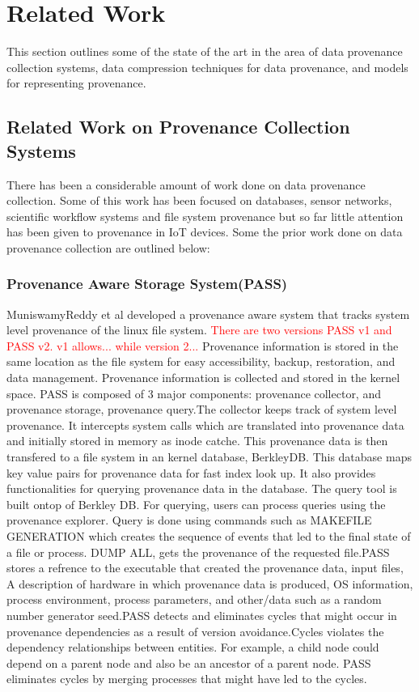 


\chapter{Related Work}\label{background}

This section outlines some of the state of the art in the area of data provenance collection systems, data compression techniques for data provenance, and models for representing provenance.


\section{Related Work on Provenance Collection Systems}

There has been a considerable amount of work done on data provenance collection. Some of this work has been focused on databases, sensor networks, scientific workflow systems and file system provenance but so far little attention has been given to provenance in IoT devices. Some the prior work done on data provenance collection are outlined below:

\subsection{Provenance Aware Storage System(PASS)}
MuniswamyReddy
et al developed a provenance aware system that tracks  system level provenance of the linux file system.\textcolor{red}{ There are two versions PASS v1 and PASS v2. v1 allows... while version 2...} Provenance information
is stored in the same location as the file system for easy accessibility, backup,
restoration, and data management. Provenance information is collected and stored in
the kernel space. PASS is composed of 3 major components: provenance collector, and provenance storage, provenance query.The collector keeps track of system level provenance. It intercepts system calls which are translated into provenance data and initially stored in memory as inode catche. This provenance data is then transfered to a file system in an kernel database, BerkleyDB. This database maps key value pairs for provenance data for fast index look up. It also provides functionalities for querying provenance data in the database. The query tool is built ontop of Berkley DB. For querying, users can process queries using the provenance explorer. Query is done using commands such as MAKEFILE  GENERATION which creates the sequence of events that led to the final state of a file or process. DUMP ALL, gets the provenance of the requested file.PASS stores a refrence to the executable that created the provenance data, input files, A description of hardware in which provenance data is produced, OS information, process environment, process parameters, and other/data such as a random number generator seed.PASS detects and eliminates cycles that might occur in provenance dependencies as a result of version avoidance.Cycles violates the dependency relationships between entities. For example, a child node could depend on a parent node and also be an ancestor of a parent node. PASS eliminates cycles by merging processes that might have led to the cycles. 

